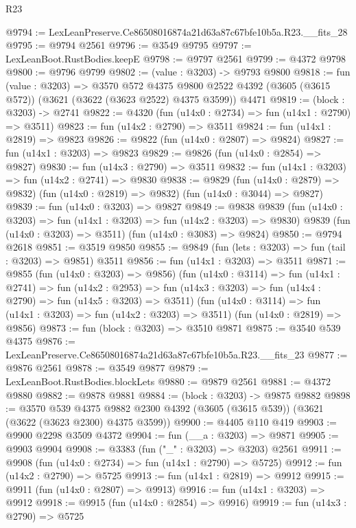 \begin{lexlean}{R23}
\begin{coremodule}
@9794 := LexLeanPreserve.Ce86508016874a21d63a87c67bfe10b5a.R23.__fits_28
@9795 := @9794 @2561
@9796 := @3549 @9795
@9797 := LexLeanBoot.RustBodies.keepE
@9798 := @9797 @2561
@9799 := @4372 @9798
@9800 := @9796 @9799
@9802 := (value : @3203) -> @9793 @9800
@9818 := fun (value : @3203) =>
  @3570
    @572
    @4375
    @9800
    @2522
    @4392
    (@3605 (@3615 @572))
    (@3621 (@3622 (@3623 @2522) @4375 @3599))
    @4471
@9819 := (block : @3203) -> @2741
@9822 := @4320 (fun (u14x0 : @2734) => fun (u14x1 : @2790) => @3511)
@9823 := fun (u14x2 : @2790) => @3511
@9824 := fun (u14x1 : @2819) => @9823
@9826 := @9822 (fun (u14x0 : @2807) => @9824)
@9827 := fun (u14x1 : @3203) => @9823
@9829 := @9826 (fun (u14x0 : @2854) => @9827)
@9830 := fun (u14x3 : @2790) => @3511
@9832 := fun (u14x1 : @3203) => fun (u14x2 : @2741) => @9830
@9838 := @9829
    (fun (u14x0 : @2879) => @9832)
    (fun (u14x0 : @2819) => @9832)
    (fun (u14x0 : @3044) => @9827)
@9839 := fun (u14x0 : @3203) => @9827
@9849 := @9838
    @9839
    (fun (u14x0 : @3203) => fun (u14x1 : @3203) => fun (u14x2 : @3203) => @9830)
    @9839
    (fun (u14x0 : @3203) => @3511)
    (fun (u14x0 : @3083) => @9824)
@9850 := @9794 @2618
@9851 := @3519 @9850
@9855 := @9849 (fun (lets : @3203) => fun (tail : @3203) => @9851) @3511
@9856 := fun (u14x1 : @3203) => @3511
@9871 := @9855
    (fun (u14x0 : @3203) => @9856)
    (fun (u14x0 : @3114) =>
    fun (u14x1 : @2741) =>
    fun (u14x2 : @2953) =>
    fun (u14x3 : @3203) => fun (u14x4 : @2790) => fun (u14x5 : @3203) => @3511)
    (fun (u14x0 : @3114) => fun (u14x1 : @3203) => fun (u14x2 : @3203) => @3511)
    (fun (u14x0 : @2819) => @9856)
@9873 := fun (block : @3203) => @3510 @9871
@9875 := @3540 @539 @4375
@9876 := LexLeanPreserve.Ce86508016874a21d63a87c67bfe10b5a.R23.__fits_23
@9877 := @9876 @2561
@9878 := @3549 @9877
@9879 := LexLeanBoot.RustBodies.blockLets
@9880 := @9879 @2561
@9881 := @4372 @9880
@9882 := @9878 @9881
@9884 := (block : @3203) -> @9875 @9882
@9898 := @3570
    @539
    @4375
    @9882
    @2300
    @4392
    (@3605 (@3615 @539))
    (@3621 (@3622 (@3623 @2300) @4375 @3599))
@9900 := @4405 @110 @419
@9903 := @9900 @2298 @3509 @4372
@9904 := fun (__a : @3203) => @9871
@9905 := @9903 @9904
@9908 := @3383 (fun ("_" : @3203) => @3203) @2561
@9911 := @9908 (fun (u14x0 : @2734) => fun (u14x1 : @2790) => @5725)
@9912 := fun (u14x2 : @2790) => @5725
@9913 := fun (u14x1 : @2819) => @9912
@9915 := @9911 (fun (u14x0 : @2807) => @9913)
@9916 := fun (u14x1 : @3203) => @9912
@9918 := @9915 (fun (u14x0 : @2854) => @9916)
@9919 := fun (u14x3 : @2790) => @5725

\end{coremodule}
\end{lexlean}
